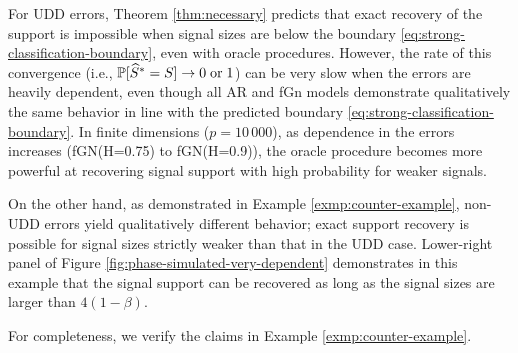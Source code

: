 For UDD errors, Theorem \ref{thm:necessary} predicts that exact recovery of the support is impossible when signal sizes are below the boundary \eqref{eq:strong-classification-boundary}, even with oracle procedures. 
However, the rate of this convergence (i.e., $\P[\widehat{S}^*=S]\to0\;\text{or}\;1$) can be very slow when the errors are heavily dependent,
even though all AR and fGn models demonstrate qualitatively the same behavior in line with the predicted boundary \eqref{eq:strong-classification-boundary}. 
In finite dimensions ($p=10\,000$), as dependence in the errors increases (fGN(H=0.75) to fGN(H=0.9)), the oracle procedure becomes more powerful at recovering signal support with high probability for weaker signals. 

On the other hand, as demonstrated in Example \ref{exmp:counter-example}, non-UDD errors yield qualitatively different behavior; exact support recovery is possible for signal sizes strictly weaker than that in the UDD case. 
Lower-right panel of Figure \ref{fig:phase-simulated-very-dependent} demonstrates in this example that the signal support can be recovered as long as the signal sizes are larger than $4(1-\beta)$.

\medskip

For completeness, we verify the claims in Example \ref{exmp:counter-example}.

